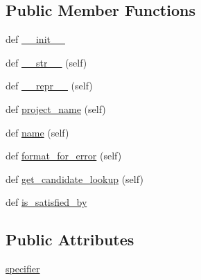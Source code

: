 \subsection*{Public Member Functions}
\begin{DoxyCompactItemize}
\item 
def \hyperlink{classpip_1_1__internal_1_1resolution_1_1resolvelib_1_1requirements_1_1RequiresPythonRequirement_a0a63d784b31cd827aca40429ee339a79}{\+\_\+\+\_\+init\+\_\+\+\_\+}
\item 
def \hyperlink{classpip_1_1__internal_1_1resolution_1_1resolvelib_1_1requirements_1_1RequiresPythonRequirement_a6a5cdd458d130133d5d7cd67fca4e4c9}{\+\_\+\+\_\+str\+\_\+\+\_\+} (self)
\item 
def \hyperlink{classpip_1_1__internal_1_1resolution_1_1resolvelib_1_1requirements_1_1RequiresPythonRequirement_aac9b8444ee667063425f926a6e7ee2d0}{\+\_\+\+\_\+repr\+\_\+\+\_\+} (self)
\item 
def \hyperlink{classpip_1_1__internal_1_1resolution_1_1resolvelib_1_1requirements_1_1RequiresPythonRequirement_a73833ac9af6812b6b2714426ee4e67a2}{project\+\_\+name} (self)
\item 
def \hyperlink{classpip_1_1__internal_1_1resolution_1_1resolvelib_1_1requirements_1_1RequiresPythonRequirement_ae36a1400c3104266be475185164c30e2}{name} (self)
\item 
def \hyperlink{classpip_1_1__internal_1_1resolution_1_1resolvelib_1_1requirements_1_1RequiresPythonRequirement_aa53534dfc58373b1c49f67255a10dc7b}{format\+\_\+for\+\_\+error} (self)
\item 
def \hyperlink{classpip_1_1__internal_1_1resolution_1_1resolvelib_1_1requirements_1_1RequiresPythonRequirement_a9f901370a07cb92a0f1e650f4a8de3bc}{get\+\_\+candidate\+\_\+lookup} (self)
\item 
def \hyperlink{classpip_1_1__internal_1_1resolution_1_1resolvelib_1_1requirements_1_1RequiresPythonRequirement_ad1ace0bf3cb75358ea22c020f7a72a03}{is\+\_\+satisfied\+\_\+by}
\end{DoxyCompactItemize}
\subsection*{Public Attributes}
\begin{DoxyCompactItemize}
\item 
\hyperlink{classpip_1_1__internal_1_1resolution_1_1resolvelib_1_1requirements_1_1RequiresPythonRequirement_a1af711e1d5390e79fdc315d956f45bab}{specifier}
\end{DoxyCompactItemize}



